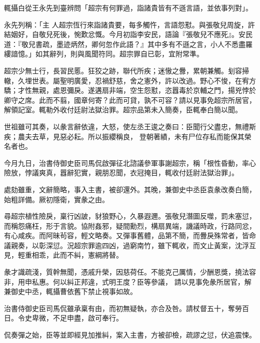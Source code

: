 \begin{pinyinscope}
 輒攝白從王永先到臺辨問「超宗有何罪過，詣諸貴皆有不遜言語，並依事列對」。



 永先列稱：「主
 人超宗恆行來詣諸貴要，每多觸忤，言語怨懟。與張敬兒周旋，許結姻好，自敬兒死後，惋歎忿慨。今月初詣李安民，語論『張敬兒不應死』。安民道：『敬兒書疏，墨迹炳然，卿何忽作此語？』其中多有不遜之言，小人不悉盡羅縷諳憶。」如其辭列，則與風聞符同。超宗罪自已彰，宜附常準。



 超宗少無士行，長習民慝。狂狡之跡，聯代所疾；迷慠之釁，累朝兼觸。刬容掃轍，久埋世表。屬聖明廣愛，忍禍舒慈，舍之憲外，許以改過。野心不悛，在宥方驕；才性無親，處恩彌戾。遂遘扇非端，空生怨懟，恣囂毒於京輔之門，揚兇悖於卿守之席。此而不翦，國章何寄？此而可貸，孰不可容？請以見事免超宗所居官，解領記室。輒勒外收付廷尉法獄治罪。超宗品第未入簡奏，臣輒奉白簡以聞。



 世祖雖可其奏，以彖言辭依違，大怒，使左丞王逡之奏曰：臣聞行父盡忠，無禮斯疾；農夫去草，見惡必耘。所以振纓稱良，
 登朝著績，未有尸位存私而能保其榮名者也。



 今月九日，治書侍御史臣司馬侃啟彈征北諮議參軍事謝超宗，稱「根性昏動，率心險放，悖議爽真，囂辭犯實，親朋忍聞，衣冠掩目，輒收付廷尉法獄治罪」。



 處劾雖重，文辭簡略，事入主書，被卻還外。其晚，兼御史中丞臣袁彖改奏白簡，始粗詳備。厥初隱衛，實彖之由。



 尋超宗植性險戾，稟行凶詖，豺狼野心，久暴遐邇。張敬兒潛圖反噬，罰未塞愆，而稱怨痛枉，形于言貌。協附姦邪，疑間勳烈，構扇異端，譏議時政，行路同忿，有心咸疾。而阿昧茍容，輕文略奏。又彈事舊體，品第不簡，而釁戾殊常者，皆命議親奏，以彰深愆。況超宗罪逾四凶，過窮南竹，雖下輒收，而文止黃案，沈浮互見，輕重相乖，此而不糾，憲綱將替。



 彖才識疏淺，質幹無聞，憑戚升榮，因慈荷任。不能克己厲情，少酬恩獎，撓法容非，用申私惠。何以糾正邦違，式明王度？臣等參議，
 請以見事免彖所居官，解兼御史中丞，輒攝曹依舊下禁止視事如故。



 治書侍御史臣司馬侃雖承稟有由，而初無疑執，亦合及咎。請杖督五十，奪勞百日。令史卑微，不足申盡，啟可奉行。



 侃奏彈之始，臣等並即經見加推糾，案入主書，方被卻檢，疏謬之愆，伏追震悚。




\end{pinyinscope}
